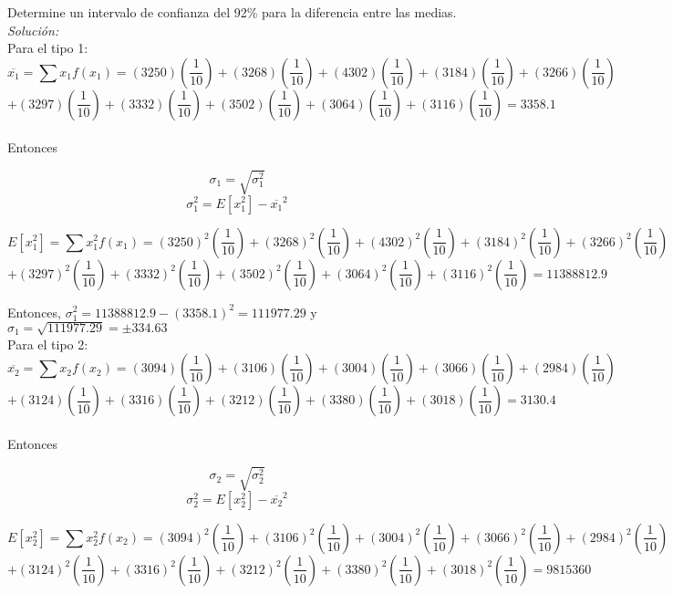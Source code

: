 \documentclass[12pt]{article}
\begin{document}
Determine un intervalo de confianza del 92\% para la diferencia entre las medias. \\

\textit{Solución: } \\
Para el tipo 1:
$$ \overline{x_{1}} = \sum x_{1}f(x_{1})= (3250)\left( \frac{1}{10} \right) + (3268)\left( \frac{1}{10} \right) + (4302)\left( \frac{1}{10} \right) + (3184)\left( \frac{1}{10} \right) + (3266)\left( \frac{1}{10} \right) $$ $$ +  (3297)\left( \frac{1}{10} \right) + (3332)\left( \frac{1}{10} \right)+ (3502)\left( \frac{1}{10} \right) + (3064)\left( \frac{1}{10} \right) + (3116)\left( \frac{1}{10} \right) = 3358.1 $$
\\
Entonces

$$ \sigma_{1} = \sqrt{\sigma_{1}^2} $$
$$ \sigma_{1}^2 = E[x_{1}^2] - \overline{x_{1}}^2 $$

$$ E[x_{1}^2] = \sum x_{1}^2f(x_{1})= (3250)^2\left( \frac{1}{10} \right) + (3268)^2\left( \frac{1}{10} \right) + (4302)^2\left( \frac{1}{10} \right) + (3184)^2\left( \frac{1}{10} \right) + (3266)^2\left( \frac{1}{10} \right) $$ $$ +  (3297)^2\left( \frac{1}{10} \right) +(3332)^2\left( \frac{1}{10} \right)+ (3502)^2\left( \frac{1}{10} \right) + (3064)^2\left( \frac{1}{10} \right) + (3116)^2\left( \frac{1}{10} \right) = 11388812.9 $$

Entonces, $ \sigma_{1}^2 = 11388812.9 -(3358.1)^2 = 111977.29 $ y $\sigma_{1} = \sqrt{111977.29} = \pm 334.63 $ \\

Para el tipo 2:
$$ \overline{x_{2}} = \sum x_{2}f(x_{2})= (3094)\left( \frac{1}{10} \right) + (3106)\left( \frac{1}{10} \right) + (3004)\left( \frac{1}{10} \right) + (3066)\left( \frac{1}{10} \right) + (2984)\left( \frac{1}{10} \right) $$ $$ +  (3124)\left( \frac{1}{10} \right) + (3316)\left( \frac{1}{10} \right)+ (3212)\left( \frac{1}{10} \right) + (3380)\left( \frac{1}{10} \right) + (3018)\left( \frac{1}{10} \right) = 3130.4 $$
\\
Entonces

$$ \sigma_{2} = \sqrt{\sigma_{2}^2} $$
$$ \sigma_{2}^2 = E[x_{2}^2] - \overline{x_{2}}^2 $$

$$ E[x_{2}^2] = \sum x_{2}^2f(x_{2})= (3094)^2\left( \frac{1}{10} \right) + (3106)^2\left( \frac{1}{10} \right) + (3004)^2\left( \frac{1}{10} \right) + (3066)^2\left( \frac{1}{10} \right) + (2984)^2\left( \frac{1}{10} \right) $$ $$ +  (3124)^2\left( \frac{1}{10} \right) +(3316)^2\left( \frac{1}{10} \right)+ (3212)^2\left( \frac{1}{10} \right) + (3380)^2\left( \frac{1}{10} \right) + (3018)^2\left( \frac{1}{10} \right) = 9815360 $$
\end{document}

